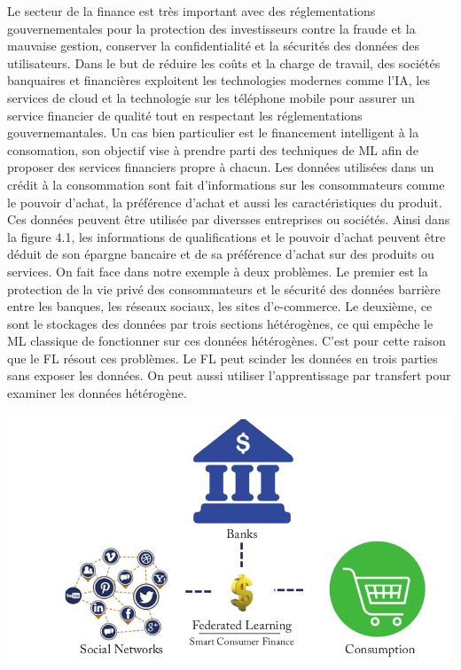 \documentclass[12pt,a4paper]{report}
\begin{document}
Le secteur de la finance est très important avec des réglementations gouvernementales pour la protection des investisseurs contre la fraude et la mauvaise gestion, conserver la confidentialité et la sécurités des données des utilisateurs. Dans le but de réduire les coûts et la charge de travail, des sociétés banquaires et financières exploitent les technologies modernes comme l'IA, les services de cloud et la technologie sur les téléphone mobile pour assurer un service financier de qualité tout en respectant les réglementations gouvernemantales. Un cas bien particulier est le financement intelligent à la consomation, son objectif vise à prendre parti des techniques de ML afin de proposer des services financiers propre à chacun. Les données utilisées dans un crédit à la consommation sont fait d'informations sur les consommateurs comme le pouvoir d'achat, la préférence d'achat et aussi les caractéristiques du produit. Ces données peuvent être utilisée par diversses entreprises ou sociétés. Ainsi dans la figure 4.1, les informations de qualifications et le pouvoir d'achat peuvent être déduit de son épargne bancaire et de sa préférence d'achat sur des produits ou services. On fait face dans notre exemple à deux problèmes. Le premier est la protection de la vie privé des consommateurs et le sécurité des données barrière entre les banques, les réseaux sociaux, les sites d'e-commerce. Le deuxième, ce sont le stockages des données par trois sections hétérogènes, ce qui empêche le ML classique de fonctionner sur ces données hétérogènes. C'est pour cette raison que le FL résout ces problèmes. Le FL peut scinder les données en trois parties sans exposer les données. On peut aussi utiliser l'apprentissage par transfert pour examiner les données hétérogène.

\begin{center}
	\includegraphics[scale=0.3]{finances}
	\label{fig1}
\end{center}
\end{document}
